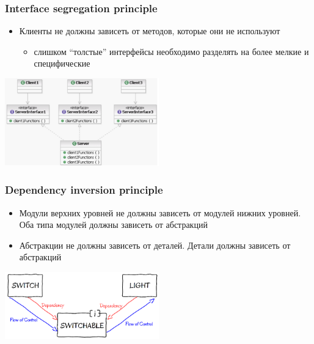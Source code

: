\documentclass{../../slides-style}
\begin{document}
    \begin{frame}
        \frametitle{Interface segregation principle}
        \begin{itemize}
            \item Клиенты не должны зависеть от методов, которые они не используют
            \begin{itemize}
                \item слишком ``толстые'' интерфейсы необходимо разделять на более мелкие и специфические
            \end{itemize}
        \end{itemize}
        \begin{flushright}
            \includegraphics[width=0.5\textwidth]{interfaceSegregationPrinciple.png}
        \end{flushright}
    \end{frame}

    \begin{frame}
        \frametitle{Dependency inversion principle}
        \begin{itemize}
            \item Модули верхних уровней не должны зависеть от модулей нижних уровней. Оба типа модулей должны зависеть от абстракций
            \item Абстракции не должны зависеть от деталей. Детали должны зависеть от абстракций
        \end{itemize}
        \begin{flushright}
            \includegraphics[width=0.5\textwidth]{dependencyInversionPrinciple.png}
        \end{flushright}
    \end{frame}
\end{document}
